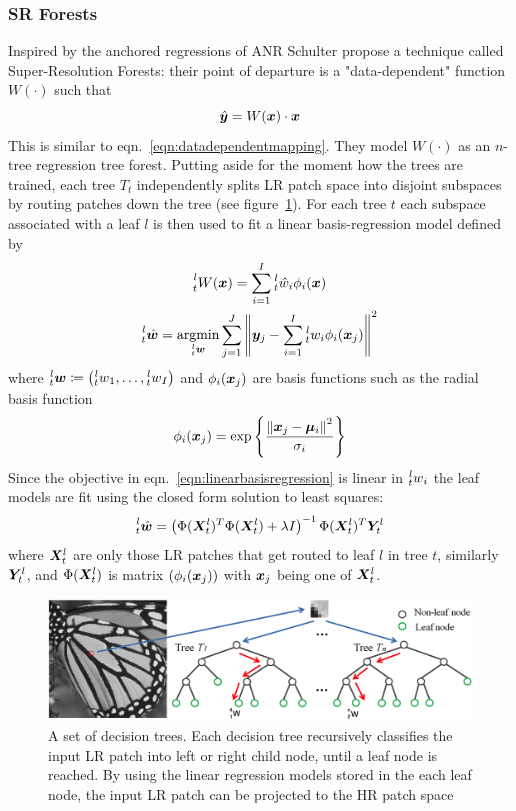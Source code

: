 \subsubsection{SR Forests}
Inspired by the anchored regressions of ANR Schulter \etal\cite{Schulter2015} propose a technique called Super-Resolution Forests: their point of departure is a "data-dependent" function $W(\cdot)$ such that
\begin{equation}
    \hat{\bm{y}} = W(\bm{x}) \cdot \bm{x}
\end{equation}
This is similar to eqn.~\eqref{eqn:datadependentmapping}.
%
They model $W(\cdot)$ as an $n$-tree regression tree forest.
%
Putting aside for the moment how the trees are trained, each tree $T_t$ independently splits LR patch space into disjoint subspaces by routing patches down the tree (see figure~\ref{fig:firf}).
%
For each tree $t$ each subspace associated with a leaf $l$ is then used to fit a linear basis-regression model defined by
\begin{gather}
    \prescript{l}{t}{W(\bx)} = \sum_{i=1}^I \prescript{l}{t}{\hat{w}_i}\phi_i(\bx) \\
    \prescript{l}{t}{\hat{\bm{w}}} = \underset{\prescript{l}{t}{\bm{w}}}{\text{argmin}} \sum_{j=1}^J \left\| \by_j - \sum_{i=1}^I \prescript{l}{t}{w_i}\phi_i(\bx_j) \right\|^2
    \label{eqn:linearbasisregression}
\end{gather}
where $\prescript{l}{t}{\bm{w}} \coloneqq \left( \prescript{l}{t}{w}_1, \mathellipsis, \prescript{l}{t}{w}_I \right)$ and $\phi_i(\bm{x}_j)$ are basis functions such as the radial basis function
\begin{equation}
    \phi_i(\bm{x}_j) = \exp \left\{ \frac{\left\| \bm{x}_j - \bm{\mu}_i \right\|^2}{\sigma_i} \right\}
\end{equation}
Since the objective in eqn.~\eqref{eqn:linearbasisregression} is linear in $\prescript{l}{t}{w}_i$ the leaf models are fit using the closed form solution to least squares:
\begin{equation}
    \prescript{l}{t}{\hat{\bm{w}}} = \left( \Phi(\bm{X}_t^l)^T \Phi(\bm{X}_t^l) + \lambda I \right)^{-1} \Phi(\bm{X}_t^l)^T \bm{Y}_t^l
\end{equation}
where $\bm{X}_t^l$ are only those LR patches that get routed to leaf $l$ in tree $t$, similarly $\bm{Y}_t^l$, and $\Phi(\bm{X}_t^l)$ is matrix $\left( \phi_i(\bm{x}_j) \right)$ with $\bm{x}_j$ being one of $\bm{X}_t^l$.
%
\begin{figure}
    \centering
    \includegraphics[width=\linewidth,keepaspectratio]{figures/FIRF.png}
    \caption{A set of decision trees. Each decision tree recursively classifies the input LR patch into left or right child node, until a leaf node is reached. By using the linear regression models stored in the each leaf node, the input LR patch can be projected to the HR patch space\cite{Huang}}
    \label{fig:firf}
\end{figure}
